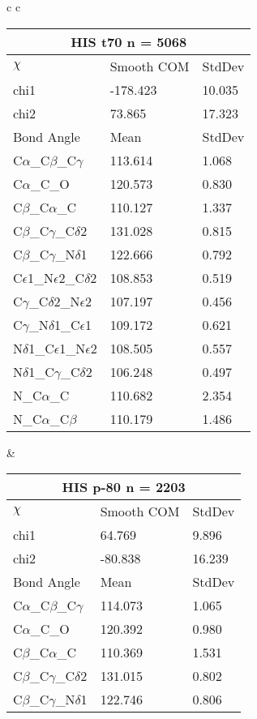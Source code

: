 \begin{longtable}{ c c }
  \begin{tabular}{ l l l }
  \toprule
  \multicolumn{3}{c}{HIS \textbf{t70} n = 5068} \\ \toprule
  $\chi$       & Smooth COM & StdDev \\ \midrule
  chi1 & -178.423 & 10.035 \\ 
  chi2 & 73.865 & 17.323 \\ \midrule
  Bond Angle   & Mean     & StdDev \\ \midrule
  C$\alpha$\_C$\beta$\_C$\gamma$ & 113.614 & 1.068\\
  C$\alpha$\_C\_O & 120.573 & 0.830\\
  C$\beta$\_C$\alpha$\_C & 110.127 & 1.337\\
  C$\beta$\_C$\gamma$\_C$\delta$2 & 131.028 & 0.815\\
  C$\beta$\_C$\gamma$\_N$\delta$1 & 122.666 & 0.792\\
  C$\epsilon$1\_N$\epsilon$2\_C$\delta$2 & 108.853 & 0.519\\
  C$\gamma$\_C$\delta$2\_N$\epsilon$2 & 107.197 & 0.456\\
  C$\gamma$\_N$\delta$1\_C$\epsilon$1 & 109.172 & 0.621\\
  N$\delta$1\_C$\epsilon$1\_N$\epsilon$2 & 108.505 & 0.557\\
  N$\delta$1\_C$\gamma$\_C$\delta$2 & 106.248 & 0.497\\
  N\_C$\alpha$\_C & 110.682 & 2.354\\
  N\_C$\alpha$\_C$\beta$ & 110.179 & 1.486\\
  \bottomrule
  \end{tabular}
  &
  \begin{tabular}{ l l l }
  \toprule
  \multicolumn{3}{c}{HIS \textbf{p-80} n = 2203} \\ \toprule
  $\chi$       & Smooth COM & StdDev \\ \midrule
  chi1 & 64.769 & 9.896 \\ 
  chi2 & -80.838 & 16.239 \\ \midrule
  Bond Angle   & Mean     & StdDev \\ \midrule
  C$\alpha$\_C$\beta$\_C$\gamma$ & 114.073 & 1.065\\
  C$\alpha$\_C\_O & 120.392 & 0.980\\
  C$\beta$\_C$\alpha$\_C & 110.369 & 1.531\\
  C$\beta$\_C$\gamma$\_C$\delta$2 & 131.015 & 0.802\\
  C$\beta$\_C$\gamma$\_N$\delta$1 & 122.746 & 0.806\\

\end{tabular}
\end{longtable}
